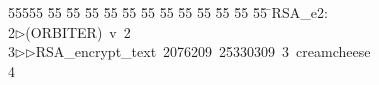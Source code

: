 %
%
\begin{tabbing}
55555 \= 55 \= 55 \= 55 \= 55 \= 55 \= 55 \= 55 \= 55 \= 55 \= 55 \= 55 \= 55 \= \>RSA\_e2:\\[0pt]
2\>$\triangleright$\>(ORBITER)\ v\ 2\ \\[0pt]
3\>$\triangleright$\>$\triangleright$\>RSA\_encrypt\_text\ 2076209\ 25330309\ 3\ creamcheese\\[0pt]
4\>\end{tabbing}
